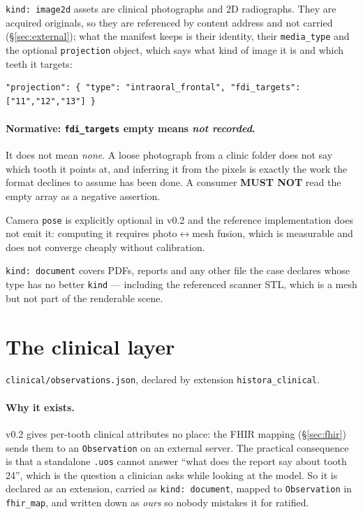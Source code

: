 \documentclass[11pt,a4paper]{article}
\newcommand{\MUSTNOT}{\textcolor{uosred}{\textbf{MUST NOT}}}
\newcommand{\code}[1]{\texttt{\small #1}}
\begin{document}
\code{kind: image2d} assets are clinical photographs and 2D radiographs. They are acquired
originals, so they are referenced by content address and not carried (\S\ref{sec:external});
what the manifest keeps is their identity, their \code{media\_type} and the optional
\code{projection} object, which says what kind of image it is and which teeth it targets:

\begin{lstlisting}[style=js]
"projection": { "type": "intraoral_frontal", "fdi_targets": ["11","12","13"] }
\end{lstlisting}

\paragraph{Normative: \code{fdi\_targets} empty means \emph{not recorded}.}
It does not mean \emph{none}. A loose photograph from a clinic folder does not say which
tooth it points at, and inferring it from the pixels is exactly the work the format
declines to assume has been done. A consumer \MUSTNOT{} read the empty array as a negative
assertion.

\vspace{6px}
Camera \code{pose} is explicitly optional in v0.2 and the reference implementation does not
emit it: computing it requires photo$\leftrightarrow$mesh fusion, which is measurable and
does not converge cheaply without calibration.

\code{kind: document} covers PDFs, reports and any other file the case declares whose type
has no better \code{kind} --- including the referenced scanner STL, which is a mesh but not
part of the renderable scene.

\section{The clinical layer}\label{sec:clinical}

\code{clinical/observations.json}, declared by extension \code{histora\_clinical}.

\paragraph{Why it exists.} v0.2 gives per-tooth clinical attributes no place: the FHIR
mapping (\S\ref{sec:fhir}) sends them to an \code{Observation} on an external server. The practical consequence is
that a standalone \code{.uos} cannot answer ``what does the report say about tooth 24'',
which is the question a clinician asks while looking at the model. So it is declared as an
extension, carried as \code{kind: document}, mapped to \code{Observation} in
\code{fhir\_map}, and written down as \emph{ours} so nobody mistakes it for ratified.
\end{document}
